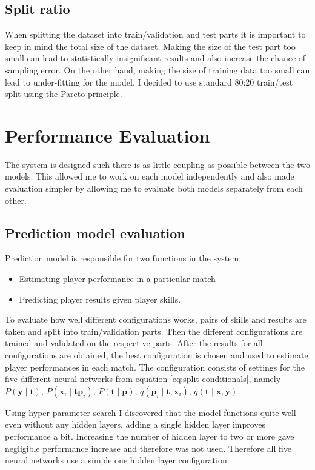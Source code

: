 \documentclass[12pt,a4paper]{book}
\newcommand\bs[1]{\boldsymbol{#1}}
\begin{document}
\subsection{Split ratio}
When splitting the dataset into train/validation and test parts it is important to keep in mind the total size of the dataset.
Making the size of the test part too small can lead to statistically insignificant results and also increase the chance of sampling error.
On the other hand, making the size of training data too small can lead to under-fitting for the model.
I decided to use standard 80:20 train/test split using the Pareto principle.

\section{Performance Evaluation}
The system is designed such there is as little coupling as possible between the two models.
This allowed me to work on each model independently and also made evaluation simpler by allowing me to evaluate both models separately from each other.
\subsection{Prediction model evaluation}
Prediction model is responsible for two functions in the system:
\begin{itemize}
\item Estimating player performance in a particular match
\item Predicting player results given player skills.
\end{itemize}

To evaluate how well different configurations works, pairs of skills and results are taken and split into train/validation parts.
Then the different configurations are trained and validated on the respective parts.
After the results for all configurations are obtained, the best configuration is chosen and used to estimate player performances in each match.
The configuration consists of settings for the five different neural networks from equation \ref{eq:split-conditionals}, namely 
$P(\bs{y}\mid\bs{t})$, $P(\bs{x}_i \mid \bs{t} \bs{p}_i)$, $P(\bs{t} \mid \bs{p})$, $q(\bs{p}_i \mid \bs{t},\bs{x}_i)$, $q(\bs{t}\mid\bs{x},\bs{y})$.

Using hyper-parameter search I discovered that the model functions quite well even without any hidden layers, adding a single hidden layer improves performance a bit.
Increasing the number of hidden layer to two or more gave negligible performance increase and therefore was not used.
Therefore all five neural networks use a simple one hidden layer configuration.
\end{document}

